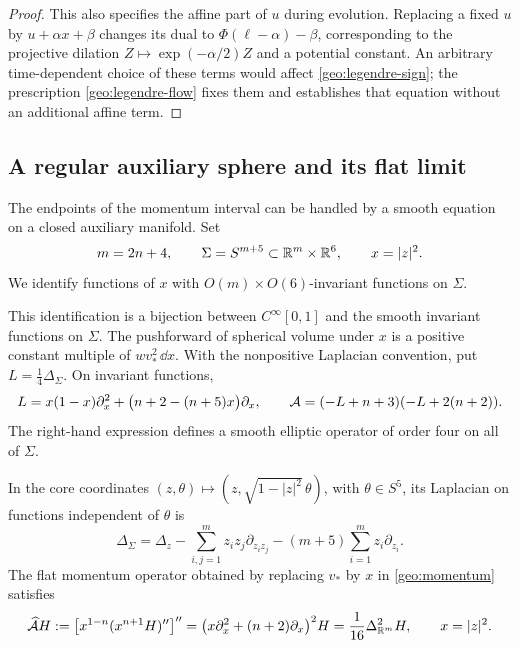 \begin{proof}
This also specifies the affine part of \(u\) during evolution.
Replacing a fixed \(u\) by \(u+\alpha x+\beta\) changes its dual to
\(\Phi(\ell-\alpha)-\beta\), corresponding to the projective
dilation \(Z\mapsto\exp(-\alpha/2)Z\) and a potential constant.
An arbitrary time-dependent choice of these terms would affect
\eqref{geo:legendre-sign}; the prescription
\eqref{geo:legendre-flow} fixes them and establishes that equation
without an additional affine term.
\end{proof}

\subsection{A regular auxiliary sphere and its flat limit}

The endpoints of the momentum interval can be handled by a smooth
equation on a closed auxiliary manifold.  Set
\begin{equation}\label{geo:sphere}
 m=2n+4,\qquad
 \Sigma=S^{m+5}\subset\mathbb{R}^m\times\mathbb{R}^6,\qquad x=|z|^2.
\end{equation}
We identify functions of \(x\) with
\(O(m)\times O(6)\)-invariant functions on \(\Sigma\).

\begin{lemma}\label{geo:operators}
This identification is a bijection between \(C^\infty[0,1]\) and the
smooth invariant functions on \(\Sigma\).  The pushforward of spherical
volume under \(x\) is a positive constant multiple of
\(wv_*^2\,\dd x\).  With the nonpositive Laplacian convention, put
\(L=\frac14\Delta_\Sigma\).  On invariant functions,
\begin{equation}\label{geo:sphere-operator}
 L=x(1-x)\partial_x^2+\big(n+2-(n+5)x\big)\partial_x,
 \qquad
 \mathcal A=(-L+n+3)(-L+2(n+2)).
\end{equation}
The right-hand expression defines a smooth elliptic operator of order
four on all of \(\Sigma\).

In the core coordinates
\((z,\theta)\mapsto(z,\sqrt{1-|z|^2}\,\theta)\), with
\(\theta\in S^5\), its Laplacian on functions independent of \(\theta\)
is
\begin{equation}\label{geo:local-laplacian}
 \Delta_\Sigma
 =\Delta_z-\sum_{i,j=1}^m z_i z_j\partial_{z_i z_j}
             -(m+5)\sum_{i=1}^m z_i\partial_{z_i}.
\end{equation}
The flat momentum operator obtained by replacing \(v_*\) by \(x\) in
\eqref{geo:momentum} satisfies
\begin{equation}\label{geo:flat-operator}
 \widehat{\mathcal A} H
 :=\big[x^{1-n}(x^{n+1}H)''\big]''
 =\big(x\partial_x^2+(n+2)\partial_x\big)^2H
 =\frac1{16}\Delta_{\mathbb{R}^m}^2H,\qquad x=|z|^2.
\end{equation}
\end{lemma}

